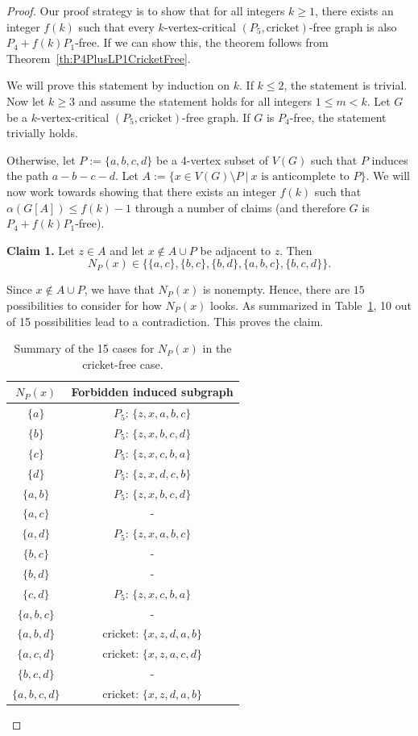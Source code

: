 \documentclass[10pt]{article}
\theoremstyle{definition}
\begin{document}
\begin{proof}
    Our proof strategy is to show that for all integers $k \geq 1$, there exists an integer $f(k)$ such that every $k$-vertex-critical $(P_5,\text{cricket})$-free graph is also $P_4+f(k) P_1$-free. If we can show this, the theorem follows from Theorem~\ref{th:P4PlusLP1CricketFree}.

    We will prove this statement by induction on $k$. If $k \leq 2$, the statement is trivial. Now let $k \geq 3$ and assume the statement holds for all integers $1 \leq m<k$. Let $G$ be a $k$-vertex-critical $(P_5,\text{cricket})$-free graph. If $G$ is $P_4$-free, the statement trivially holds. 
    
    Otherwise, let $P := \{a,b,c,d\}$ be a 4-vertex subset of $V(G)$ such that $P$ induces the path $a-b-c-d$. Let $A := \{x \in V(G) \setminus P ~|~x\text{ is anticomplete to }P\}$. We will now work towards showing that there exists an integer $f(k)$ such that $\alpha(G[A]) \leq f(k)-1$ through a number of claims (and therefore $G$ is $P_4+f(k)P_1$-free).
    \bigskip 


\noindent \textbf{Claim 1.} Let $z \in A$ and let $x \notin A \cup P$ be adjacent to $z$. Then 
$$N_P(x) \in \{\{a,c\},\{b,c\},\{b,d\},\{a,b,c\},\{b,c,d\}\}.$$

\bigskip

Since $x \notin A \cup P$, we have that $N_P(x)$ is nonempty. Hence, there are $15$ possibilities to consider for how $N_P(x)$ looks. As summarized in Table~\ref{tab:PossibilitiesForNPxCricket}, 10 out of 15 possibilities lead to a contradiction. This proves the claim.

\begin{table}[h]
\centering
\begin{tabular}{c|c}
\hline
$N_P(x)$ & Forbidden induced subgraph \\
\hline
$\{a\}$ & $P_5$: $\{z,x,a,b,c\}$\\
$\{b\}$ & $P_5$: $\{z,x,b,c,d\}$\\
$\{c\}$ & $P_5$: $\{z,x,c,b,a\}$\\
$\{d\}$ & $P_5$: $\{z,x,d,c,b\}$\\
$\{a,b\}$ & $P_5$: $\{z,x,b,c,d\}$\\
$\{a,c\}$ & -\\
$\{a,d\}$ & $P_5$: $\{z,x,a,b,c\}$\\
$\{b,c\}$ & -\\
$\{b,d\}$ & -\\
$\{c,d\}$ & $P_5$: $\{z,x,c,b,a\}$\\
$\{a,b,c\}$ & -\\
$\{a,b,d\}$ & $\text{cricket}$: $\{x,z,d,a,b\}$\\
$\{a,c,d\}$ & $\text{cricket}$: $\{x,z,a,c,d\}$\\
$\{b,c,d\}$ & -\\
$\{a,b,c,d\}$ & $\text{cricket}$: $\{x,z,d,a,b\}$\\
\hline
\end{tabular}
\caption{Summary of the 15 cases for $N_P(x)$ in the cricket-free case.}
\label{tab:PossibilitiesForNPxCricket}
\end{table}


\end{proof}
\end{document}
